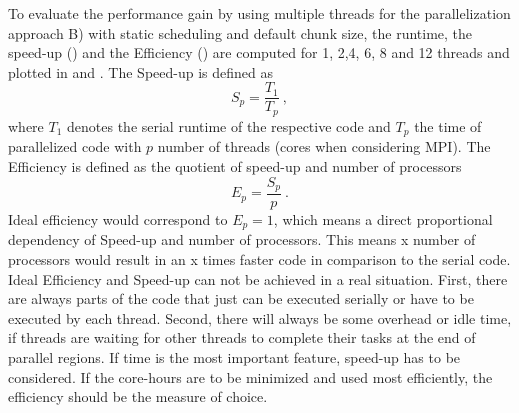 To evaluate the performance gain by using multiple threads for the parallelization approach B) with static scheduling and default chunk size, the runtime, the speed-up () and the Efficiency () are computed for 1, 2,4, 6, 8 and 12 threads and plotted in   and . The Speed-up is defined as 
%
\begin{equation} \label{eq:SpeedUp}
	S_p = \frac{T_1}{T_p} \ ,
\end{equation}
%
where $T_1$ denotes the serial runtime of the respective code and $T_p$ the time of parallelized code with $p$ number of threads (cores when considering MPI). The Efficiency is defined as the quotient of speed-up and number of processors 
%
\begin{equation}\label{eq:Efficiency}
	E_p = \frac{S_p}{p} \ .
\end{equation}
%
Ideal efficiency would correspond to $E_p=1$, which means a direct proportional dependency of Speed-up and number of processors. This means x number of processors would result in an x times faster code in comparison to the serial code. Ideal Efficiency and Speed-up can not be achieved in a real situation. First, there are always parts of the code that just can be executed serially or have to be executed by each thread. Second, there will always be some overhead or idle time, if threads are waiting for other threads to complete their tasks at the end of parallel regions. If time is the most important feature, speed-up has to be considered. If the core-hours are to be minimized and used most efficiently, the efficiency should be the measure of choice.

